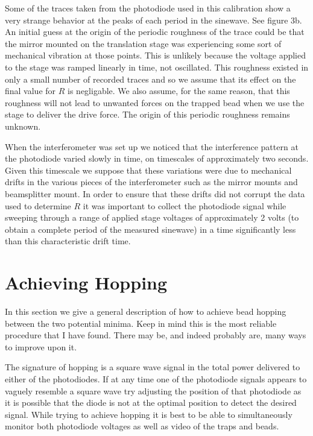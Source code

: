 \documentclass{report}
\begin{document}
Some of the traces taken from the photodiode used in this calibration show a very strange behavior at the peaks of each period in the sinewave. See figure 3b. An initial guess at the origin of the periodic roughness of the trace could be that the mirror mounted on the translation stage was experiencing some sort of mechanical vibration at those points. This is unlikely because the voltage applied to the stage was ramped linearly in time, not oscillated. This roughness existed in only a small number of recorded traces and so we assume that its effect on the final value for $R$ is negligable. We also assume, for the same reason, that this roughness will not lead to unwanted forces on the trapped bead when we use the stage to deliver the drive force. The origin of this periodic roughness remains unknown.

When the interferometer was set up we noticed that the interference pattern at the photodiode varied slowly in time, on timescales of approximately two seconds. Given this timescale we suppose that these variations were due to mechanical drifts in the various pieces of the interferometer such as the mirror mounts and beamsplitter
mount. In order to ensure that these drifts did not corrupt the data used to determine $R$ it was important to collect the photodiode signal while sweeping through a range of applied stage voltages of approximately 2 volts (to obtain a complete period of the measured sinewave) in a time significantly less than this characteristic drift time.


\chapter{Achieving Hopping}

In this section we give a general description of how to achieve bead hopping between the two potential minima. Keep in mind this is the most reliable procedure that I have found. There may be, and indeed probably are, many ways to improve upon it.

The signature of hopping is a square wave signal in the total power delivered to either of the photodiodes. If at any time one of the photodiode signals appears to vaguely resemble a square wave try adjusting the position of that photodiode as it is possible that the diode is not at the optimal position to detect the desired signal. While trying to achieve hopping it is best to be able to simultaneously monitor both photodiode voltages as well as video of the traps and beads.
\end{document}
